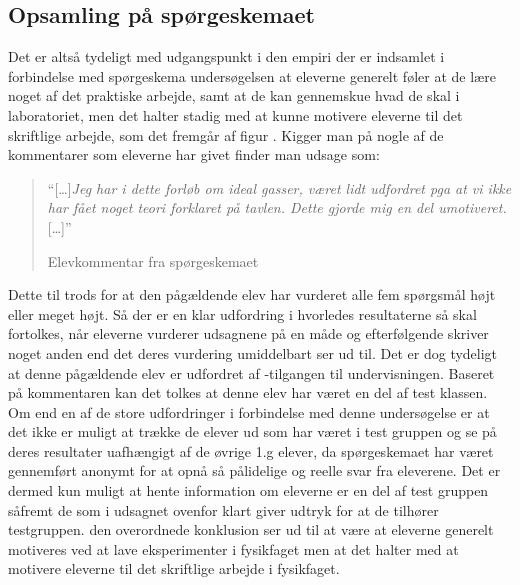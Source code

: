 \subsection*{Opsamling på spørgeskemaet}
Det er altså tydeligt med udgangspunkt i den empiri der er indsamlet i forbindelse med spørgeskema undersøgelsen at eleverne generelt føler at de lære noget af det praktiske arbejde, samt at de kan gennemskue hvad de skal i laboratoriet, men det halter stadig med at kunne motivere eleverne til det skriftlige arbejde, som det fremgår af figur .
Kigger man på nogle af de kommentarer som eleverne har givet finder man udsage som:
\begin{quote}
	``[\ldots]\emph{Jeg har i dette forløb om ideal gasser, været lidt udfordret pga at vi ikke har fået noget teori forklaret på tavlen. Dette gjorde mig en del umotiveret.}[\ldots]''\vspace{-15pt}
\begin{flushright}
	Elevkommentar fra spørgeskemaet
\end{flushright}
\end{quote}
Dette til trods for at den pågældende elev har vurderet alle fem spørgsmål højt eller meget højt. Så der er en klar udfordring i hvorledes resultaterne så skal fortolkes, når eleverne vurderer udsagnene på en måde og efterfølgende skriver noget anden end det deres vurdering umiddelbart ser ud til. Det er dog tydeligt at denne pågældende elev er udfordret af \ib{}-tilgangen til undervisningen. Baseret på kommentaren kan det tolkes at denne elev har været en del af test klassen. Om end en af de store udfordringer i forbindelse med denne undersøgelse er at det ikke er muligt at trække de elever ud som har været i test gruppen og se på deres resultater uafhængigt af de øvrige 1.g elever, da spørgeskemaet har været gennemført anonymt for at opnå så pålidelige og reelle svar fra eleverene. Det er dermed kun muligt at hente information om eleverne er en del af test gruppen såfremt de som i udsagnet ovenfor klart giver udtryk for at de tilhører testgruppen. den overordnede konklusion ser ud til at være at eleverne generelt motiveres ved at lave eksperimenter i fysikfaget men at det halter med at motivere eleverne til det skriftlige arbejde i fysikfaget.  

